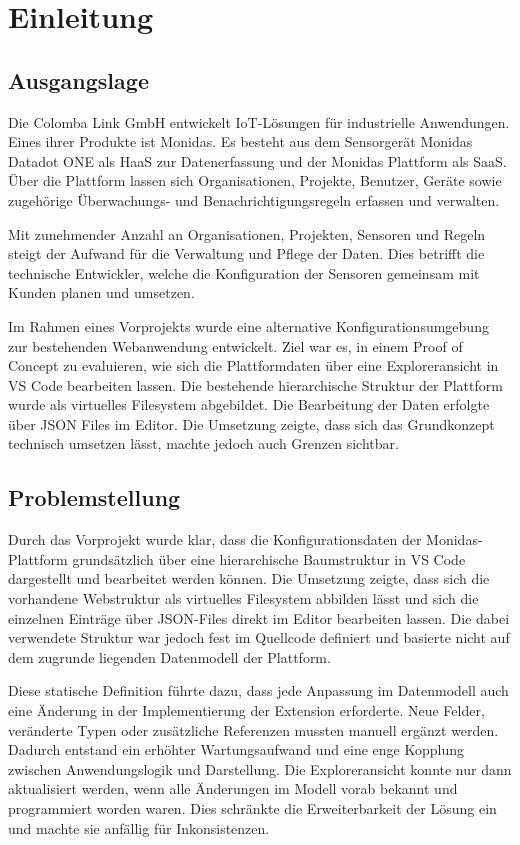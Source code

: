 \section{Einleitung}
\subsection{Ausgangslage}
Die Colomba Link GmbH entwickelt IoT-Lösungen für industrielle Anwendungen. Eines ihrer Produkte ist Monidas. Es besteht aus dem Sensorgerät Monidas Datadot ONE als HaaS zur Datenerfassung und der Monidas Plattform als SaaS. Über die Plattform lassen sich Organisationen, Projekte, Benutzer, Geräte sowie zugehörige Überwachungs- und Benachrichtigungsregeln erfassen und verwalten.  

Mit zunehmender Anzahl an Organisationen, Projekten, Sensoren und Regeln steigt der Aufwand für die Verwaltung und Pflege der Daten. Dies betrifft die technische Entwickler, welche die Konfiguration der Sensoren gemeinsam mit Kunden planen und umsetzen.

Im Rahmen eines Vorprojekts wurde eine alternative Konfigurationsumgebung zur bestehenden Webanwendung entwickelt. Ziel war es, in einem Proof of Concept zu evaluieren, wie sich die Plattformdaten über eine  Exploreransicht in VS Code bearbeiten lassen. Die bestehende hierarchische Struktur der Plattform wurde als virtuelles Filesystem abgebildet. Die Bearbeitung der Daten erfolgte über JSON Files im Editor. Die Umsetzung zeigte, dass sich das Grundkonzept technisch umsetzen lässt, machte jedoch auch Grenzen sichtbar.


\subsection{Problemstellung}
Durch das Vorprojekt wurde klar, dass die Konfigurationsdaten der Monidas-Plattform grundsätzlich über eine hierarchische Baumstruktur in VS Code dargestellt und bearbeitet werden können. Die Umsetzung zeigte, dass sich die vorhandene Webstruktur als virtuelles Filesystem abbilden lässt und sich die einzelnen Einträge über JSON-Files direkt im Editor bearbeiten lassen. Die dabei verwendete Struktur war jedoch fest im Quellcode definiert und basierte nicht auf dem zugrunde liegenden Datenmodell der Plattform.

Diese statische Definition führte dazu, dass jede Anpassung im Datenmodell auch eine Änderung in der Implementierung der Extension erforderte. Neue Felder, veränderte Typen oder zusätzliche Referenzen mussten manuell ergänzt werden. Dadurch entstand ein erhöhter Wartungsaufwand und eine enge Kopplung zwischen Anwendungslogik und Darstellung. Die Exploreransicht konnte nur dann aktualisiert werden, wenn alle Änderungen im Modell vorab bekannt und programmiert worden waren. Dies schränkte die Erweiterbarkeit der Lösung ein und machte sie anfällig für Inkonsistenzen.

